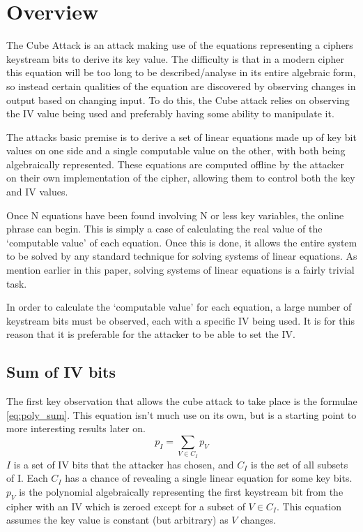\documentclass{report}
\let\Oldsection\section
\renewcommand{\section}{\FloatBarrier\Oldsection}
\let\Oldsubsection\subsection
\renewcommand{\subsection}{\FloatBarrier\Oldsubsection}
\begin{document}
\section{Overview}
The Cube Attack is an attack making use of the equations representing a ciphers keystream bits to derive its key value. The difficulty is that in a modern cipher this equation will be too long to be described/analyse in its entire algebraic form, so instead certain qualities of the equation are discovered by observing changes in output based on changing input. To do this, the Cube attack relies on observing the IV value being used and preferably having some ability to manipulate it.

The attacks basic premise is to derive a set of linear equations made up of key bit values on one side and a single computable value on the other, with both being algebraically represented. These equations are computed offline by the attacker on their own implementation of the cipher, allowing them to control both the key and IV values.

Once N equations have been found involving N or less key variables, the online phrase can begin. This is simply a case of calculating the real value of the `computable value' of each equation. Once this is done, it allows the entire system to be solved by any standard technique for solving systems of linear equations. As mention earlier in this paper, solving systems of linear equations is a fairly trivial task.

In order to calculate the `computable value' for each equation, a large number of keystream bits must be observed, each with a specific IV being used. It is for this reason that it is preferable for the attacker to be able to set the IV.

\subsection{Sum of IV bits}
The first key observation that allows the cube attack to take place is the formulae \ref{eq:poly_sum}. This equation isn't much use on its own, but is a starting point to more interesting results later on.
\begin{equation} \label{eq:poly_sum}
p_I = \sum\limits_{V \in C_I} p_V
\end{equation}
$I$ is a set of IV bits that the attacker has chosen, and $C_I$ is the set of all subsets of I. Each $C_I$ has a chance of revealing a single linear equation for some key bits.
$p_V$ is the polynomial algebraically representing the first keystream bit from the cipher with an IV which is zeroed except for a subset of $V\in C_I$. This equation assumes the key value is constant (but arbitrary) as $V$ changes.
\end{document}
